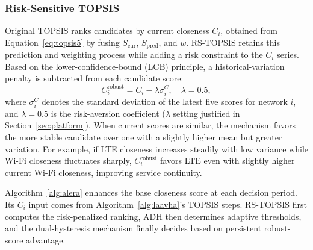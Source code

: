 \documentclass[preprint,12pt]{elsarticle}
\begin{document}
\subsubsection{Risk-Sensitive TOPSIS}\label{sec:rstopsis}

Original TOPSIS ranks candidates by current closeness $C_i$, obtained from Equation~\eqref{eq:topsis5} by fusing $S_{\mathrm{cur}}$, $S_{\mathrm{pred}}$, and $w$. RS-TOPSIS retains this prediction and weighting process while adding a risk constraint to the $C_i$ series. Based on the lower-confidence-bound (LCB) principle, a historical-variation penalty is subtracted from each candidate score:
\begin{equation}
C_i^{\mathrm{robust}}=C_i-\lambda\sigma_i^C,\quad \lambda=0.5,
\label{eq:rstopsis}
\end{equation}
where $\sigma_i^C$ denotes the standard deviation of the latest five scores for network $i$, and $\lambda=0.5$ is the risk-aversion coefficient ($\lambda$ setting justified in Section~\ref{sec:platform}). When current scores are similar, the mechanism favors the more stable candidate over one with a slightly higher mean but greater variation. For example, if LTE closeness increases steadily with low variance while Wi-Fi closeness fluctuates sharply, $C_i^{\mathrm{robust}}$ favors LTE even with slightly higher current Wi-Fi closeness, improving service continuity.

Algorithm~\ref{alg:alera} enhances the base closeness score at each decision period. Its $C_i$ input comes from Algorithm~\ref{alg:laavha}'s TOPSIS steps. RS-TOPSIS first computes the risk-penalized ranking, ADH then determines adaptive thresholds, and the dual-hysteresis mechanism finally decides based on persistent robust-score advantage.
\end{document}
